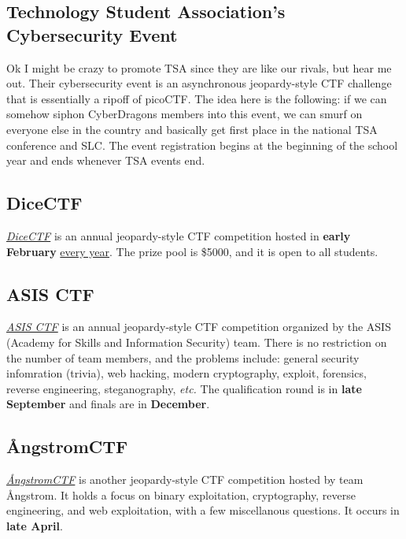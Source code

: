 \documentclass[
  letterpaper,
  DIV=11,
  numbers=noendperiod]{scrartcl}
\begin{document}
\hypertarget{technology-student-associations-cybersecurity-event}{%
\subsection{Technology Student Association's Cybersecurity
Event}\label{technology-student-associations-cybersecurity-event}}

Ok I might be crazy to promote TSA since they are like our rivals, but
hear me out. Their cybersecurity event is an asynchronous jeopardy-style
CTF challenge that is essentially a ripoff of picoCTF. The idea here is
the following: if we can somehow siphon CyberDragons members into this
event, we can smurf on everyone else in the country and basically get
first place in the national TSA conference and SLC. The event
registration begins at the beginning of the school year and ends
whenever TSA events end.

\hypertarget{dicectf}{%
\subsection{DiceCTF}\label{dicectf}}

\href{https://ctf.dicega.ng/}{\emph{DiceCTF}} is an annual
jeopardy-style CTF competition hosted in \textbf{early February}
\href{https://github.com/dicegang/dicectf-2023-challenges}{every year}.
The prize pool is \$5000, and it is open to all students.

\hypertarget{asis-ctf}{%
\subsection{ASIS CTF}\label{asis-ctf}}

\href{https://asisctf.com/}{\emph{ASIS CTF}} is an annual jeopardy-style
CTF competition organized by the ASIS (Academy for Skills and
Information Security) team. There is no restriction on the number of
team members, and the problems include: general security infomration
(trivia), web hacking, modern cryptography, exploit, forensics, reverse
engineering, steganography, \emph{etc.} The qualification round is in
\textbf{late September} and finals are in \textbf{December}.

\hypertarget{uxe5ngstromctf}{%
\subsection{ÅngstromCTF}\label{uxe5ngstromctf}}

\href{https://angstromctf.com/}{\emph{ÅngstromCTF}} is another
jeopardy-style CTF competition hosted by team Ångstrom. It holds a focus
on binary exploitation, cryptography, reverse engineering, and web
exploitation, with a few miscellanous questions. It occurs in
\textbf{late April}.
\end{document}
